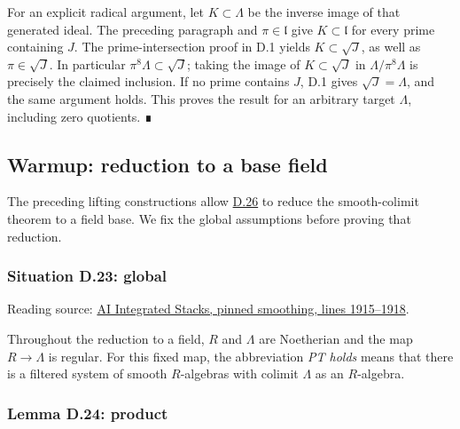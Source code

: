 \documentclass[11pt,a4paper,openany]{report}
\begin{document}
For an explicit radical argument, let \(K\subset\Lambda\) be the inverse image of that generated ideal. The preceding paragraph and \(\pi\in\mathfrak l\) give \(K\subset\mathfrak l\) for every prime containing \(J\). The prime-intersection proof in D.1 yields \(K\subset\sqrt J\), as well as \(\pi\in\sqrt J\). In particular \(\pi^8\Lambda\subset\sqrt J\); taking the image of \(K\subset\sqrt J\) in \(\Lambda/\pi^8\Lambda\) is precisely the claimed inclusion. If no prime contains \(J\), D.1 gives \(\sqrt J=\Lambda\), and the same argument holds. This proves the result for an arbitrary target \(\Lambda\), including zero quotients. ∎

\subsection{Warmup: reduction to a base field}\label{AG-RG-S05-warmup-reduction-to-a-base-field}

\label{AG-RG-S05-smoothing-section-reduction}

The preceding lifting constructions allow \hyperref[AG-RG-S05-smoothing-lemma-reduce-to-field]{D.26} to reduce the smooth-colimit theorem to a field base. We fix the global assumptions before proving that reduction.

\label{AG-RG-S05-smoothing-situation-global}

\subsubsection{Situation D.23: global}\label{AG-RG-S05-situation-d.23-global}

Reading source: \href{https://github.com/KokunoYumeto/unofficial-stacks-project-ai-drafts/blob/565b10e987aba5969b21145a0833f42d69f96790/smoothing.tex\#L1915-L1918}{AI Integrated Stacks, pinned smoothing, lines 1915--1918}.

Throughout the reduction to a field, \(R\) and \(\Lambda\) are Noetherian and the map \(R\to\Lambda\) is regular. For this fixed map, the abbreviation \emph{PT holds} means that there is a filtered system of smooth \(R\)-algebras with colimit \(\Lambda\) as an \(R\)-algebra.

\label{AG-RG-S05-smoothing-lemma-product}

\subsubsection{Lemma D.24: product}\label{AG-RG-S05-lemma-d.24-product}
\end{document}
